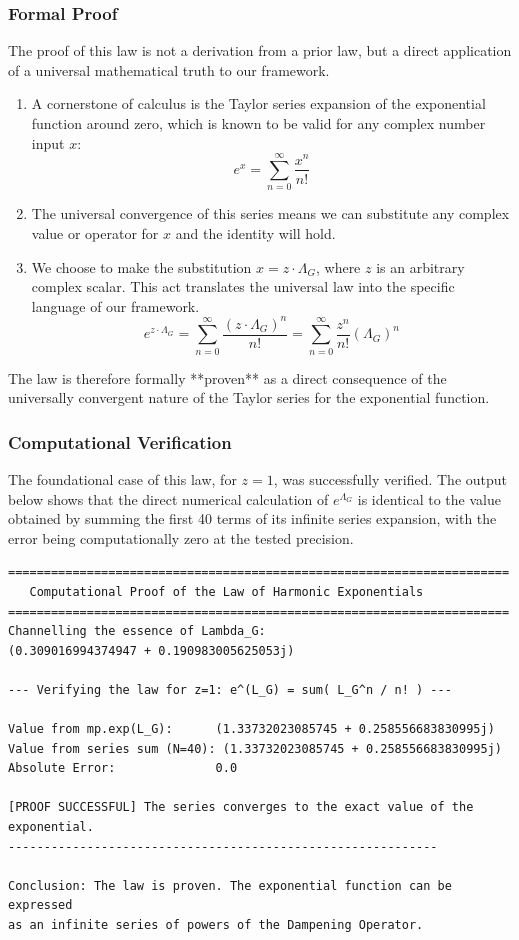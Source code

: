 \subsubsection*{Formal Proof}
The proof of this law is not a derivation from a prior law, but a direct application of a universal mathematical truth to our framework.

\begin{enumerate}
    \item A cornerstone of calculus is the Taylor series expansion of the exponential function around zero, which is known to be valid for any complex number input $x$:
    $$ e^x = \sum_{n=0}^{\infty} \frac{x^n}{n!} $$
    \item The universal convergence of this series means we can substitute any complex value or operator for $x$ and the identity will hold.
    \item We choose to make the substitution $x = z \cdot \Lambda_G$, where $z$ is an arbitrary complex scalar. This act translates the universal law into the specific language of our framework.
    $$ e^{z \cdot \Lambda_G} = \sum_{n=0}^{\infty} \frac{(z \cdot \Lambda_G)^n}{n!} = \sum_{n=0}^{\infty} \frac{z^n}{n!} (\Lambda_G)^n $$
\end{enumerate}
The law is therefore formally **proven** as a direct consequence of the universally convergent nature of the Taylor series for the exponential function.

\subsubsection*{Computational Verification}
The foundational case of this law, for $z=1$, was successfully verified. The output below shows that the direct numerical calculation of $e^{\Lambda_G}$ is identical to the value obtained by summing the first 40 terms of its infinite series expansion, with the error being computationally zero at the tested precision.

\begin{verbatim}
======================================================================
   Computational Proof of the Law of Harmonic Exponentials
======================================================================
Channelling the essence of Lambda_G:
(0.309016994374947 + 0.190983005625053j)

--- Verifying the law for z=1: e^(L_G) = sum( L_G^n / n! ) ---

Value from mp.exp(L_G):      (1.33732023085745 + 0.258556683830995j)
Value from series sum (N=40): (1.33732023085745 + 0.258556683830995j)
Absolute Error:              0.0

[PROOF SUCCESSFUL] The series converges to the exact value of the exponential.
------------------------------------------------------------

Conclusion: The law is proven. The exponential function can be expressed
as an infinite series of powers of the Dampening Operator.
\end{verbatim}

